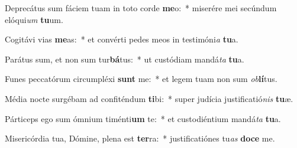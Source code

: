 \item Deprecátus sum fáciem tuam in toto corde \textbf{me}o:~* miserére mei secúndum elóqui\textit{um} \textbf{tu}um.
\item Cogitávi vias \textbf{me}as:~* et convérti pedes meos in testimóni\textit{a} \textbf{tu}a.
\item Parátus sum, et non sum tur\textbf{bá}tus:~* ut custódiam mandá\textit{ta} \textbf{tu}a.
\item Funes peccatórum circumpléxi \textbf{sunt} me:~* et legem tuam non sum \textit{ob}\textbf{lí}tus.
\item Média nocte surgébam ad confiténdum \textbf{ti}bi:~* super judícia justificatió\textit{nis} \textbf{tu}æ.
\item Párticeps ego sum ómnium timénti\textbf{um} te:~* et custodiéntium mandá\textit{ta} \textbf{tu}a.
\item Misericórdia tua, Dómine, plena est \textbf{ter}ra:~* justificatiónes tu\textit{as} \textbf{do}\textbf{ce} me.
